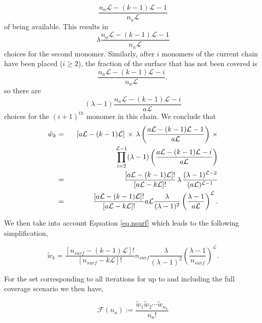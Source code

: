 \documentclass[12pt,letterpaper]{article}
\newcommand{\leng}{\mathcal{L}}
\newcommand{\fop}{\ensuremath{\mathcal{F}}}
\begin{document}
$$
\frac{n_a\leng-(k-1)\leng-1}{n_a\leng}
$$
of being available.  
This results in
$$
\lambda
\frac{
    n_a
    \leng
    -
    (k-1)
    \leng
    -
    1
}{
    n_a
    \leng
}
$$
choices for the second monomer. Similarly, after $i$ monomers of the current chain have been placed ($i\geq 2$), the fraction of the surface that has not been covered is
$$
\frac{n_a\leng-(k-1)\leng-i}{n_a\leng},
$$
so there are
$$
(
\lambda
-1
)
\frac{
n_a
\leng
-
(k-1)
\leng
-
i
}{
a\leng
}
$$
choices for the $(i+1)^{th}$ monomer in this chain. We conclude that 
\begin{eqnarray}
   \tilde{w}_k  & = &   [a\leng-(k-1)\leng]\,\times \,\lambda\left(\frac{ a\leng-(k-1)\leng-1}{a\leng}\right)    \,\times
   \nonumber    \\
   & &    \hspace{22mm}
     \prod_{i=2}^{\leng-1}(\lambda-1)\left(\frac{ a\leng-(k-1)\leng-i}{a\leng}\right)  
      \nonumber \\
 & = &    \frac{[a\leng-(k-1)\leng]!}{[a\leng-k\leng]!} \,\lambda\,  \frac{(\lambda-1)^{\leng-2}}{(a\leng)^{\leng-1}}  
     \nonumber    \\
     & = &    \frac{[a\leng-(k-1)\leng]!}{[a\leng-k\leng]!}   a\leng \frac{\lambda}{(\lambda-1)^2}\left(  \frac{\lambda-1}{a\leng}\right)^{\leng}.
     \label{eq.wk2supp}
\end{eqnarray}

We then take into account Equation \ref{eq.nsurf} which leads to the following simplification,

\begin{equation}
   \tilde{w}_k 
   =
   \frac{
        [
            n_{surf}
            -
            (
                    k
                -
                1
            )
                \leng
        ]
        !
   }{
        [
            n_{surf}
            -
        k
        \leng
        ]
        !
   }   
    n_{surf}
   \frac{
        \lambda
   }{
        (\lambda-1)^2
   }
   \left(
        \frac{
            \lambda
            -
            1
        }{
            n_{surf}
        }
    \right)
    ^{
            \leng
    }.
    \label{wk2supp}
\end{equation}

For the set corresponding to all iterations for up to and including the full coverage scenario we then have, 


\begin{equation}
    \fop(n_a) 
    :=      
    \frac{
        \tilde{w}_1
        \tilde{w}_2
        \cdots 
        \tilde{w}_{n_a}
    }{
        n_a!
    }
    \label{Gofna}
\end{equation}
\end{document}
